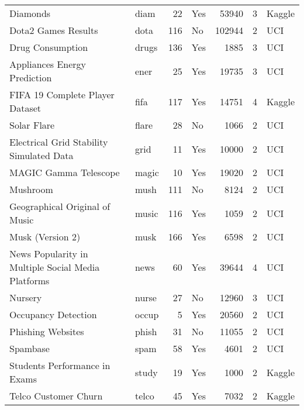 \begin{tabular}{llrlrrl}
                                          Diamonds &    diam &   22 &             Yes &  53940 &  3 & Kaggle \\
                               Dota2 Games Results &    dota &  116 &              No & 102944 &  2 &    UCI \\
                                  Drug Consumption &   drugs &  136 &             Yes &   1885 &  3 &    UCI \\
                      Appliances Energy Prediction &    ener &   25 &             Yes &  19735 &  3 &    UCI \\
                   FIFA 19 Complete Player Dataset &    fifa &  117 &             Yes &  14751 &  4 & Kaggle \\
                                       Solar Flare &   flare &   28 &              No &   1066 &  2 &    UCI \\
          Electrical Grid Stability Simulated Data &    grid &   11 &             Yes &  10000 &  2 &    UCI \\
                             MAGIC Gamma Telescope &   magic &   10 &             Yes &  19020 &  2 &    UCI \\
                                          Mushroom &    mush &  111 &              No &   8124 &  2 &    UCI \\
                    Geographical Original of Music &   music &  116 &             Yes &   1059 &  2 &    UCI \\
                                  Musk (Version 2) &    musk &  166 &             Yes &   6598 &  2 &    UCI \\
News Popularity in Multiple Social Media Platforms &    news &   60 &             Yes &  39644 &  4 &    UCI \\
                                           Nursery &   nurse &   27 &              No &  12960 &  3 &    UCI \\
                               Occupancy Detection &   occup &    5 &             Yes &  20560 &  2 &    UCI \\
                                 Phishing Websites &   phish &   31 &              No &  11055 &  2 &    UCI \\
                                          Spambase &    spam &   58 &             Yes &   4601 &  2 &    UCI \\
                     Students Performance in Exams &   study &   19 &             Yes &   1000 &  2 & Kaggle \\
                              Telco Customer Churn &   telco &   45 &             Yes &   7032 &  2 & Kaggle \\

\end{tabular}
